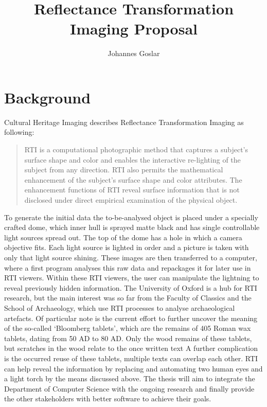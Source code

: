 \documentclass{article}
\title{Reflectance Transformation Imaging Proposal}
\author{Johannes Goslar}
\begin{document}
\maketitle

\section{Background}
Cultural Heritage Imaging describes Reflectance Transformation Imaging as following\cite{CHIRTI}:
\begin{quote}
  RTI is a computational photographic method that captures a subject’s surface shape and color and enables the interactive re-lighting of the subject from any direction. RTI also permits the mathematical enhancement of the subject’s surface shape and color attributes. The enhancement functions of RTI reveal surface information that is not disclosed under direct empirical examination of the physical object.
\end{quote}
To generate the initial data the to-be-analysed object is placed under a
specially crafted dome, which inner hull is sprayed matte black and has single
controllable light sources spread out. The top of the dome has a hole in which a
camera objective fits. Each light source is lighted in order and a picture is
taken with only that light source shining. These images are then transferred to a
computer, where a first program analyses this raw data and repackages it for
later use in RTI viewers. Within these RTI viewers, the user can manipulate the
lightning to reveal previously hidden information.
The University of Oxford is a hub for RTI research, but the main interest was
so far from the Faculty of Classics and the School of Archaeology, which use RTI
processes to analyse archaeological artefacts.\cite{earl2011reflectance} Of
particular note is the current effort to further uncover the meaning of the
so-called `Bloomberg tablets', which are the remains of 405 Roman wax tablets,
dating from 50 AD to 80 AD. Only the wood remains of these tablets, but
scratches in the wood relate to the once written text  A further complication is
the occurred reuse of these tablets, multiple texts can overlap each other.\cite{bloomberg} RTI
can help reveal the information by replacing and automating two human eyes
and a light torch by the means discussed above. The
thesis will aim to integrate the Department of Computer Science with the ongoing
research and finally provide the other stakeholders with better software to
achieve their goals.
\end{document}
